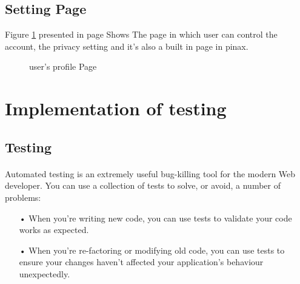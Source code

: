 \documentclass[12pt,a4paper,class,twoside,openany]{report}
\begin{document}
{\subsection{Setting Page}
Figure \ref{fg:4-26} presented in page \pageref{fg:4-26} Shows The page in which user can control the account, the privacy setting and it's also a built in page in pinax.
\begin{figure}
\begin{center}
\caption{ user's profile Page }
\label{fg:4-26}
\end{center}
\end{figure}
\section{Implementation of testing}
\subsection{Testing}
\paragraph*{\hspace{.9 cm} } Automated testing is an extremely useful bug-killing tool for the modern Web developer. You can use a collection of tests to solve, or avoid, a number of problems:
\begin{itemize}

\item[•] When you're writing new code, you can use tests to validate your code works as expected.
\item[•] When you're re-factoring or modifying old code, you can use tests to ensure your changes haven't affected your application's behaviour unexpectedly.
\end{itemize}
}
\end{document}
